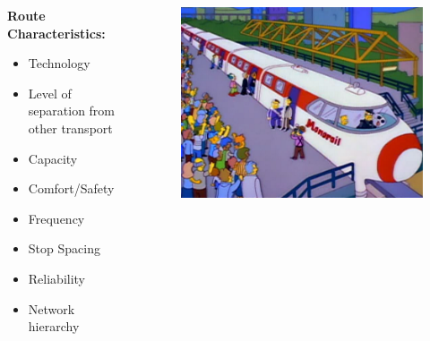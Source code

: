 \documentclass[aspectratio=169]{beamer}
\begin{document}
\begin{frame}
	
	
	
	\begin{columns}
		\begin{column}{0.5\textwidth}
			
			\textbf{Route Characteristics:	}
			
			\vspace{2mm}
			\begin{itemize}
				\item Technology
				\item Level of separation from other transport
				\item Capacity
				\item Comfort/Safety
				\item Frequency
				\item Stop Spacing
				\item Reliability
				\item Network hierarchy
			\end{itemize}
			
			
		\end{column}
		
		\begin{column}{0.5\textwidth}
			\begin{figure}
				\centering
				\includegraphics[width=0.98\linewidth]{images/monorail.png}
			\end{figure}
			
		\end{column}
		
	\end{columns}
	

	
\end{frame}
\end{document}
